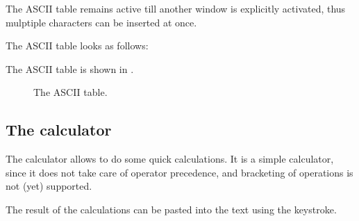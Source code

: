 The ASCII table remains active till another window is explicitly activated,
thus mulptiple characters can be inserted at once.
\begin{htmlonly}
The ASCII table looks as follows:
\end{htmlonly}
\begin{latexonly}
The ASCII table is shown in .
\begin{figure}[ht]
\begin{center}
\caption{The ASCII table.}\label{fig:asciitable}
\ifpdf
{}
\else
{}
\fi
\end{center}
\end{figure}
\end{latexonly}

%
%
\subsection{The calculator}
\label{se:calculator}
The calculator allows to do some quick calculations. It is a simple
calculator, since it does not take care of operator precedence, and
bracketing of operations is not (yet) supported.

The result of the calculations can be pasted into the text using the
 keystroke.

